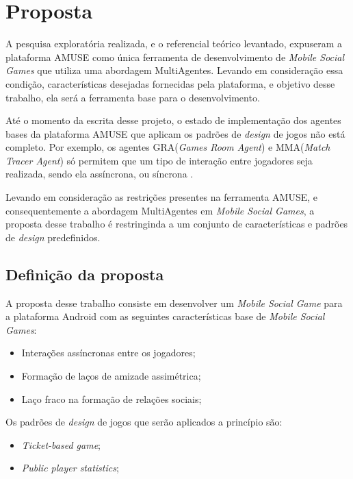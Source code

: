 \chapter[Proposta]{Proposta}

A pesquisa exploratória realizada, e o referencial teórico levantado, expuseram a
plataforma AMUSE como única ferramenta de desenvolvimento de \textit{Mobile Social Games}
que utiliza uma abordagem MultiAgentes. Levando em consideração essa condição,
características desejadas fornecidas pela plataforma, e objetivo desse trabalho, ela
será a ferramenta base para o desenvolvimento.

Até o momento da escrita desse projeto, o estado de implementação dos agentes bases da
plataforma AMUSE que aplicam os padrões de \textit{design} de jogos não está completo.
Por exemplo, os agentes GRA(\textit{Games Room Agent}) e MMA(\textit{Match Tracer Agent})
só permitem que um tipo de interação entre jogadores seja realizada,
sendo ela assíncrona, ou síncrona \cite{bergenti2013}.

Levando em consideração as restrições presentes na ferramenta AMUSE, e consequentemente a
abordagem MultiAgentes em \textit{Mobile Social Games}, a proposta desse trabalho
é restringinda a um conjunto de características e padrões de \textit{design} predefinidos.

\section{Definição da proposta}

A proposta desse trabalho consiste em desenvolver um \textit{Mobile Social Game} para a
plataforma Android com as seguintes características base de \textit{Mobile Social Games}:

\begin{itemize}
  \item Interações assíncronas entre os jogadores;
  \item Formação de laços de amizade assimétrica;
  \item Laço fraco na formação de relações sociais;
\end{itemize}

Os padrões de \textit{design} de jogos que serão aplicados a princípio são:

\begin{itemize}
  \item \textit{Ticket-based game};
  \item \textit{Public player statistics};
\end{itemize}

